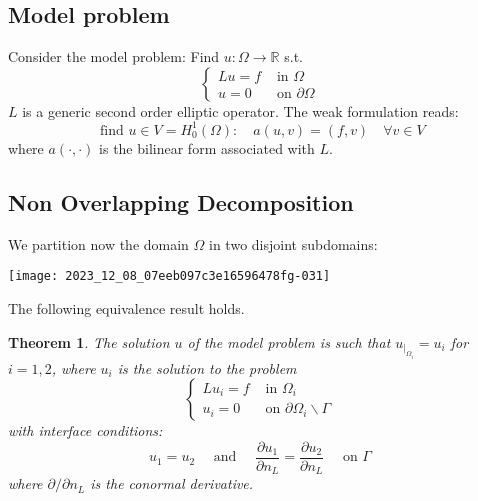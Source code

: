 \documentclass[11pt]{book}
\newtheorem{theorem}{Theorem}
\begin{document}
\subsection*{Model problem}
Consider the model problem:
Find $u: \Omega \rightarrow \mathbb{R}$ s.t.
$$
\begin{cases}L u=f & \text { in } \Omega \\ u=0 & \text { on } \partial \Omega\end{cases}
$$
$L$ is a generic second order elliptic operator.
The weak formulation reads:
$$
\text { find } u \in V=H_{0}^{1}(\Omega): \quad a(u, v)=(f, v) \quad \forall v \in V
$$
where $a(\cdot, \cdot)$ is the bilinear form associated with $L$.


\subsection*{Non Overlapping Decomposition}
We partition now the domain $\Omega$ in two disjoint subdomains:
\begin{center}
\texttt{[image: 2023\_12\_08\_07eeb097c3e16596478fg-031]}
\end{center}
The following equivalence result holds.
\begin{theorem}
The solution $u$ of the model problem is such that $u_{\left.\right|_{\Omega_{i}}}=u_{i}$ for $i=1,2$, where $u_{i}$ is the solution to the problem
$$
\begin{cases}L u_{i}=f & \text { in } \Omega_{i} \\ u_{i}=0 & \text { on } \partial \Omega_{i} \backslash \Gamma\end{cases}
$$
with interface conditions:
$$
u_{1}=u_{2} \quad \text { and } \quad \frac{\partial u_{1}}{\partial n_{L}}=\frac{\partial u_{2}}{\partial n_{L}} \quad \text { on } \Gamma
$$
where $\partial / \partial n_{L}$ is the conormal derivative.
\end{theorem}
\end{document}
